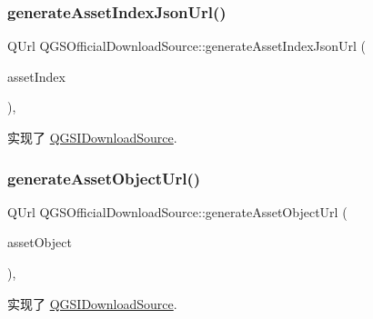 \subsubsection{\texorpdfstring{generate\+Asset\+Index\+Json\+Url()}{generateAssetIndexJsonUrl()}}
{\footnotesize\ttfamily Q\+Url Q\+G\+S\+Official\+Download\+Source\+::generate\+Asset\+Index\+Json\+Url (\begin{DoxyParamCaption}\item[{const \mbox{\hyperlink{class_q_g_s_asset_index}{Q\+G\+S\+Asset\+Index}} \&}]{asset\+Index }\end{DoxyParamCaption})\hspace{0.3cm}{\ttfamily [override]}, {\ttfamily [virtual]}}



实现了 \mbox{\hyperlink{class_q_g_s_i_download_source_a12254719fa1c75880cc5bcd9c04d052a}{Q\+G\+S\+I\+Download\+Source}}.

\mbox{\label{class_q_g_s_official_download_source_a06f16b9134010980f1403caecc22a9af}} 
\subsubsection{\texorpdfstring{generate\+Asset\+Object\+Url()}{generateAssetObjectUrl()}}
{\footnotesize\ttfamily Q\+Url Q\+G\+S\+Official\+Download\+Source\+::generate\+Asset\+Object\+Url (\begin{DoxyParamCaption}\item[{const \mbox{\hyperlink{class_q_g_s_asset_object}{Q\+G\+S\+Asset\+Object}} \&}]{asset\+Object }\end{DoxyParamCaption})\hspace{0.3cm}{\ttfamily [override]}, {\ttfamily [virtual]}}



实现了 \mbox{\hyperlink{class_q_g_s_i_download_source_acf94724d53217be5f8ed39c035f8aece}{Q\+G\+S\+I\+Download\+Source}}.

\mbox{\label{class_q_g_s_official_download_source_a212e5a145ed60ce8868069d2e09a4d59}} 
